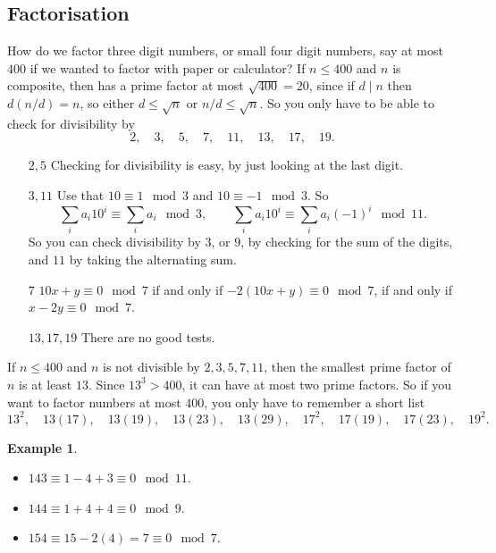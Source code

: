 \documentclass{article}
\newcommand{\rb}[1]{\left( #1 \right)}
\theoremstyle{definition}\newtheorem{definition}{Definition}
\theoremstyle{definition}\newtheorem{remark}[definition]{Remark}
\theoremstyle{definition}\newtheorem*{example}{Example}
\theoremstyle{definition}\newtheorem*{note}{Note}
\begin{document}
\subsection{Factorisation}

How do we factor three digit numbers, or small four digit numbers, say at most $ 400 $ if we wanted to factor with paper or calculator? If $ n \le 400 $ and $ n $ is composite, then has a prime factor at most $ \sqrt{400} = 20 $, since if $ d \mid n $ then $ d\rb{n / d} = n $, so either $ d \le \sqrt{n} $ or $ n / d \le \sqrt{n} $. So you only have to be able to check for divisibility by
$$ 2, \quad 3, \quad 5, \quad 7, \quad 11, \quad 13, \quad 17, \quad 19. $$
\begin{itemize}[leftmargin=0.75in]
\item[$ 2, 5 $] Checking for divisibility is easy, by just looking at the last digit.
\item[$ 3, 11 $] Use that $ 10 \equiv 1 \mod 3 $ and $ 10 \equiv -1 \mod 3 $. So
$$ \sum_i a_i10^i \equiv \sum_i a_i \mod 3, \qquad \sum_i a_i10^i \equiv \sum_i a_i\rb{-1}^i \mod 11. $$
So you can check divisibility by $ 3 $, or $ 9 $, by checking for the sum of the digits, and $ 11 $ by taking the alternating sum.
\item[$ 7 $] $ 10x + y \equiv 0 \mod 7 $ if and only if $ -2\rb{10x + y} \equiv 0 \mod 7 $, if and only if $ x - 2y \equiv 0 \mod 7 $.
\item[$ 13, 17, 19 $] There are no good tests.
\end{itemize}
If $ n \le 400 $ and $ n $ is not divisible by $ 2, 3, 5, 7, 11 $, then the smallest prime factor of $ n $ is at least $ 13 $. Since $ 13^3 > 400 $, it can have at most two prime factors. So if you want to factor numbers at most $ 400 $, you only have to remember a short list
$$ 13^2, \quad 13\rb{17}, \quad 13\rb{19}, \quad 13\rb{23}, \quad 13\rb{29}, \quad 17^2, \quad 17\rb{19}, \quad 17\rb{23}, \quad 19^2. $$

\begin{example}
\hfill
\begin{itemize}
\item $ 143 \equiv 1 - 4 + 3 \equiv 0 \mod 11 $.
\item $ 144 \equiv 1 + 4 + 4 \equiv 0 \mod 9 $.
\item $ 154 \equiv 15 - 2\rb{4} = 7 \equiv 0 \mod 7 $.
\end{itemize}
\end{example}

\end{document}
